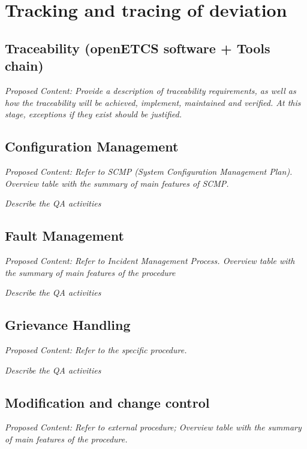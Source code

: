 \documentclass{template/openetcs_article}
\begin{document}
\section{Tracking and tracing of deviation}


\subsection{Traceability (openETCS software + Tools chain)}
\textit{Proposed Content: Provide a description of traceability requirements, as well as how the traceability will be achieved, implement, maintained and verified. At this stage, exceptions if they exist should be justified.}

\subsection{Configuration Management}
\textit{Proposed Content: Refer to SCMP (System Configuration Management Plan). Overview table with the summary of main features of SCMP.}


\textit{Describe the QA activities}

\subsection{Fault Management}
\textit{Proposed Content: Refer to Incident Management Process. Overview table with the summary of main features of the procedure}


\textit{Describe the QA activities}

\subsection{Grievance Handling}
\textit{Proposed Content: Refer to the specific procedure. }

\textit{Describe the QA activities}

\subsection{Modification and change control }
\textit{Proposed Content: Refer to external procedure; Overview table with the summary of main features of the procedure.}
\end{document}
